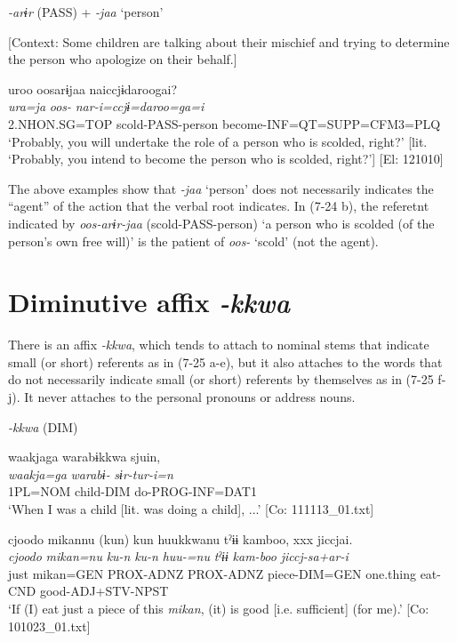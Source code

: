 \ex \label{ex:7:24b}\textit{{}-arɨr} (PASS) + \textit{{}-jaa} ‘person’

    [Context: Some children are talking about their mischief and trying to determine the person who apologize on their behalf.]

\glll  uroo  oosarɨjaa  naiccjɨdaroogai?\\
\textit{ura=ja}  \textit{oos-}  \textit{nar-i=ccjɨ=daroo=ga=i}\\
2.NHON.SG=TOP  scold-PASS-person  become-INF=QT=SUPP=CFM3=PLQ\\
\glt ‘Probably, you will undertake the role of a person who is scolded, right?’ [lit. ‘Probably, you intend to become the person who is scolded, right?’] [El: 121010]
\z
\z

The above examples show that \textit{{}-jaa} ‘person’ does not necessarily indicates the “agent” of the action that the verbal root indicates. In (7-24 b), the referetnt indicated by \textit{oos-arɨr-jaa} (scold-PASS-person) ‘a person who is scolded (of the person’s own free will)’ is the patient of \textit{oos-} ‘scold’ (not the agent).

\section{Diminutive affix \textit{{}-kkwa}}

There is an affix \textit{{}-kkwa}, which tends to attach to nominal stems that indicate small (or short) referents as in (7-25 a-e), but it also attaches to the words that do not necessarily indicate small (or short) referents by themselves as in (7-25 f-j). It never attaches to the personal pronouns or address nouns.

\ea \label{ex:7:25}  \textit{{}-kkwa} (DIM)

\ea \label{ex:7:25a}%
\glll  waakjaga  warabɨkkwa  sjuin,\\
\textit{waakja=ga}  \textit{warabɨ-}  \textit{sɨr-tur-i=n}\\
1PL=NOM  child-DIM  do-PROG-INF=DAT1\\
\glt ‘When I was a child [lit. was doing a child], ...’ [Co: 111113\_01.txt]

\ex \label{ex:7:25b}%
\glll  {\textbar}cjoodo  mikan{\textbar}nu  (kun)  kun  huukkwanu  tˀɨɨ  kamboo,  xxx  jiccjai.\\
\textit{cjoodo}  \textit{mikan=nu}  \textit{ku-n}  \textit{ku-n}  \textit{huu-=nu} \textit{tˀɨɨ}  \textit{kam-boo}    \textit{jiccj-sa+ar-i}\\
just  mikan=GEN  PROX-ADNZ  PROX-ADNZ  piece-DIM=GEN  one.thing  eat-CND    good-ADJ+STV-NPST\\
\glt ‘If (I) eat just a piece of this \textit{mikan}, (it) is good [i.e. sufficient] (for me).’ [Co: 101023\_01.txt]

